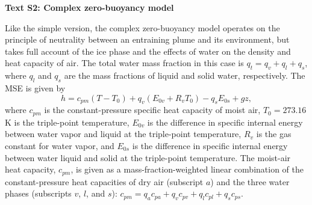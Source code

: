 \documentclass[draft,grl]{agutexSI}
\begin{document}
\begin{article}
\noindent\textbf{Text S2: Complex zero-buoyancy model}

Like the simple version, the complex zero-buoyancy model operates on the principle of neutrality between an entraining plume and its environment, but takes full account of the ice phase and the effects of water on the density and heat capacity of air. The total water mass fraction in this case is $q_t = q_v + q_l + q_s$, where $q_l$ and $q_s$ are the mass fractions of liquid and solid water, respectively. The MSE is given by 
\begin{equation}\label{eq:MSE_full}
h = c_{pm}(T-T_0) + q_v(E_{0v} + R_vT_0) - q_sE_{0s} + gz,
\end{equation}
\noindent where $c_{pm}$ is the constant-pressure specific heat capacity of moist air, $T_0=273.16$ K is the triple-point temperature, $E_{0v}$ is the difference in specific internal energy between water vapor and liquid at the triple-point temperature, $R_v$ is the gas constant for water vapor, and $E_{0s}$ is the difference in specific internal energy between water liquid and solid at the triple-point temperature. The moist-air heat capacity, $c_{pm}$, is given as a mass-fraction-weighted linear combination of the constant-pressure heat capacities of dry air (subscript $a$) and the three water phases (subscripts $v$, $l$, and $s$): $c_{pm} = q_a c_{pa} + q_v c_{pv} + q_l c_{pl} + q_s c_{ps}$.


\end{article}
\end{document}
